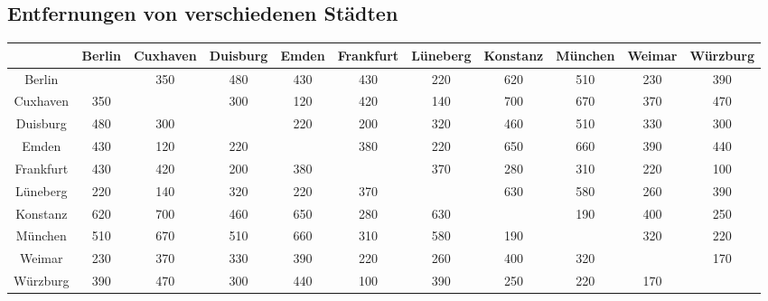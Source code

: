 \documentclass{article}
\begin{document}
\begin{landscape}
\section*{Entfernungen von verschiedenen Städten}

\begin{tabular}{ |c|c|c|c|c|c|c|c|c|c|c| }
\hline
 & Berlin & Cuxhaven & Duisburg & Emden & Frankfurt & Lüneberg & Konstanz & München & Weimar & Würzburg \\
\hline
Berlin &  & 350 & 480 & 430 & 430 & 220 & 620 & 510 & 230 & 390 \\
\hline
Cuxhaven & 350 &  & 300 & 120 & 420 & 140 & 700 & 670 & 370 & 470 \\
\hline
Duisburg & 480 & 300 &  & 220 & 200 & 320 & 460 & 510 & 330 & 300 \\
\hline
Emden & 430 & 120 & 220 &  & 380 & 220 & 650 & 660 & 390 & 440 \\
\hline
Frankfurt & 430 & 420 & 200 & 380 &  & 370 & 280 & 310 & 220 & 100 \\
\hline
Lüneberg & 220 & 140 & 320 & 220 & 370 &  & 630 & 580 & 260 & 390 \\
\hline
Konstanz & 620 & 700 & 460 & 650 & 280 & 630 &  & 190 & 400 & 250 \\
\hline
München & 510 & 670 & 510 & 660 & 310 & 580 & 190 &  & 320 & 220 \\
\hline
Weimar & 230 & 370 & 330 & 390 & 220 & 260 & 400 & 320 &  & 170 \\
\hline
Würzburg & 390 & 470 & 300 & 440 & 100 & 390 & 250 & 220 & 170 & \\
\hline
\end{tabular}
	
\end{landscape}
	
\end{document}
